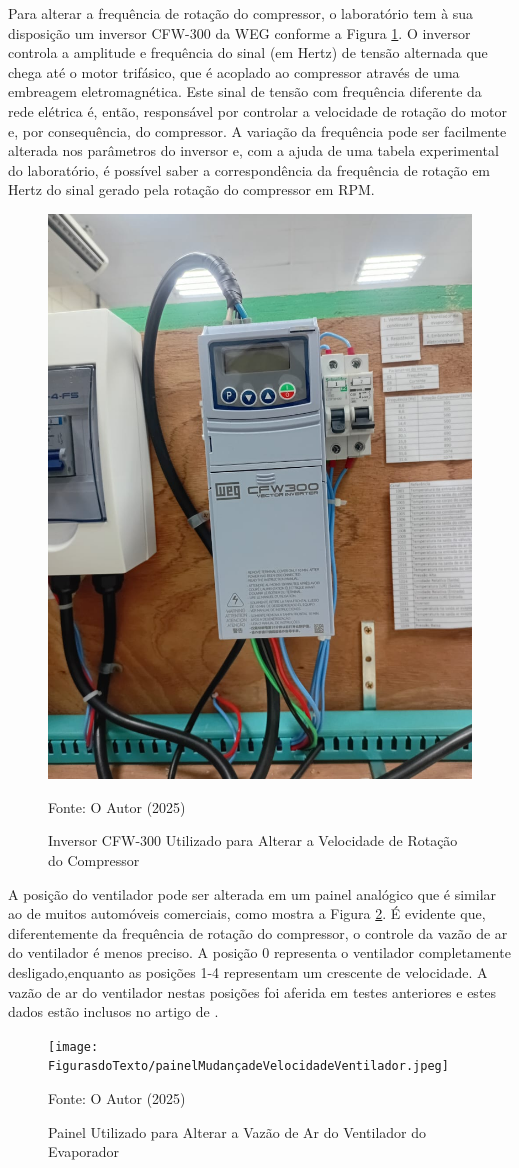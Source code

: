 Para alterar a frequência de rotação do compressor, o laboratório \textcite{reve2023} tem à sua disposição um inversor CFW-300 da WEG conforme a Figura \ref{fig:inversor CFW-300}. O inversor controla a amplitude e frequência do sinal (em Hertz) de tensão alternada que chega até o motor trifásico, que é acoplado ao compressor através de uma embreagem eletromagnética. Este sinal de tensão com frequência diferente da rede elétrica é, então, responsável por controlar a velocidade de rotação do motor e, por consequência, do compressor. A variação da frequência pode ser facilmente alterada nos parâmetros do inversor e, com a ajuda de uma tabela experimental do laboratório, é possível saber a correspondência da frequência de rotação em Hertz do sinal gerado pela rotação do compressor em RPM.

\begin{figure}[h]
    \centering
    \includegraphics[width=0.45\linewidth]{FigurasdoTexto/inversorcfw-300.jpeg}
    \caption{Inversor CFW-300 Utilizado para Alterar a Velocidade de Rotação do Compressor}
    \label{fig:inversor CFW-300}
    {\footnotesize Fonte: O Autor (2025)}
\end{figure}

A posição do ventilador pode ser alterada em um painel analógico que é similar ao de muitos automóveis comerciais, como mostra a Figura \ref{fig:painelMudançadeVelocidadeVentilador}. É evidente que, diferentemente da frequência de rotação do compressor, o controle da vazão de ar do ventilador é menos preciso. A posição 0 representa o ventilador completamente desligado,enquanto as posições 1-4 representam um crescente de velocidade. A vazão de ar do ventilador nestas posições foi aferida em testes anteriores e estes dados estão inclusos no artigo de \textcite{ExperimentalThermalPerformance}.
\newpage
\begin{figure}[h]
    \centering
    \texttt{[image: FigurasdoTexto/painelMudançadeVelocidadeVentilador.jpeg]}
    \caption{Painel Utilizado para Alterar a Vazão de Ar do Ventilador do Evaporador}
    \label{fig:painelMudançadeVelocidadeVentilador}

    {\footnotesize Fonte: O Autor (2025)}

\end{figure}

